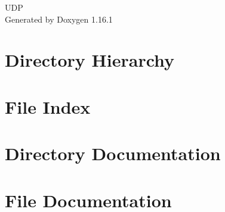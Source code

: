 \documentclass[twoside]{book}
\newcommand{\+}{\discretionary{\mbox{\scriptsize$\hookleftarrow$}}{}{}}
\newcommand{\clearemptydoublepage}{%
    \newpage{\pagestyle{empty}\cleardoublepage}%
  }
\begin{document}
  \raggedbottom
    \hypersetup{pageanchor=false,
                bookmarksnumbered=true,
                pdfencoding=unicode
               }
  \begin{titlepage}
  \vspace*{7cm}
  \begin{center}%
  {\Large UDP}\\
  \vspace*{1cm}
  {\large Generated by Doxygen 1.16.1}\\
  \end{center}
  \end{titlepage}
  \clearemptydoublepage
  \tableofcontents
  \clearemptydoublepage
  \hypersetup{pageanchor=true}

\chapter{Directory Hierarchy}

\chapter{File Index}

\chapter{Directory Documentation}






\chapter{File Documentation}







  \backmatter
  \newpage
  \clearemptydoublepage
  \printindex
\end{document}
